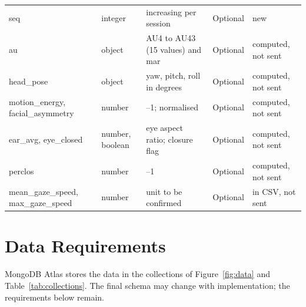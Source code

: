 \documentclass[a4paper,11pt]{scrreprt}
\begin{document}
\begin{longtable}{@{}>{\ttfamily\footnotesize}p{3.6cm}>{\raggedright\arraybackslash}p{1.7cm}>{\raggedright\arraybackslash}p{3.7cm}c>{\raggedright\arraybackslash}p{3.3cm}@{}}
seq & integer & increasing per session & Optional & new\\
au & object & AU4 to AU43 (15 values) and mar & Optional & computed, not sent\\
head_pose & object & yaw, pitch, roll in degrees & Optional & computed, not sent\\
motion_energy, facial_asymmetry & number & 0--1; normalised & Optional & computed, not sent\\
ear_avg, eye_closed & number, boolean & eye aspect ratio; closure flag & Optional & computed, not sent\\
perclos & number & 0--1 & Optional & computed, not sent\\
mean_gaze_speed, max_gaze_speed & number & unit to be confirmed & Optional & in CSV, not sent\\
\end{longtable}

\section{Data Requirements}\label{sec:data}
MongoDB Atlas stores the data in the collections of Figure~\ref{fig:data} and Table~\ref{tab:collections}. The final schema may change with implementation; the requirements below remain.
\end{document}
